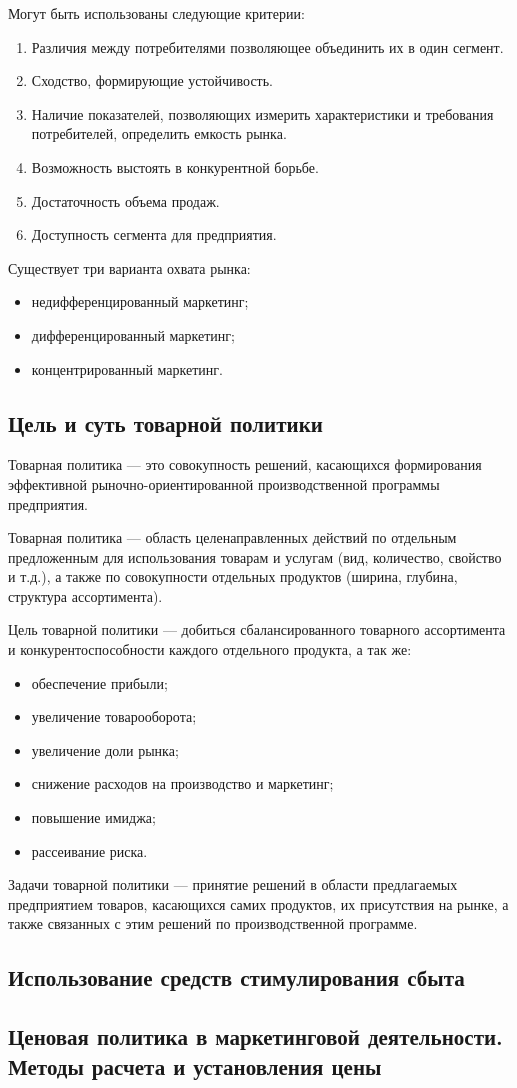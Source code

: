 \documentclass[a4paper,12pt,oneside,final]{extarticle}
\numberwithin{equation}{section}
\begin{document}
Могут быть использованы следующие критерии:
\begin{enumerate}
	\item Различия между потребителями позволяющее объединить их в один сегмент.
	\item Сходство, формирующие устойчивость.
	\item Наличие показателей, позволяющих измерить характеристики и требования потребителей, определить емкость рынка.
	\item Возможность выстоять в конкурентной борьбе.
	\item Достаточность объема продаж.
	\item Доступность сегмента для предприятия.
\end{enumerate}

Существует три варианта охвата рынка:
\begin{itemize}
	\item недифференцированный маркетинг;
	\item дифференцированный маркетинг;
	\item концентрированный маркетинг.
\end{itemize}

\subsection{Цель и суть товарной политики}
Товарная политика --- это совокупность решений, касающихся формирования эффективной рыночно-ориентированной производственной программы предприятия.

Товарная политика ­­--- область целенаправленных действий по отдельным предложенным для использования товарам и услугам (вид, количество, свойство и т.д.), а также по совокупности отдельных продуктов (ширина, глубина, структура ассортимента).

Цель товарной политики --- добиться сбалансированного товарного ассортимента и конкурентоспособности каждого отдельного продукта, а так же:
\begin{itemize}
		\item обеспечение прибыли;
		\item увеличение товарооборота;
		\item увеличение доли рынка;
		\item снижение расходов на производство и маркетинг;
		\item повышение имиджа;
		\item рассеивание риска.
\end{itemize}

Задачи товарной политики --- принятие решений в области предлагаемых предприятием товаров, касающихся самих продуктов, их присутствия на рынке, а также связанных с этим решений по производственной программе.

\subsection{Использование средств стимулирования сбыта}

\subsection{Ценовая политика в маркетинговой деятельности. Методы расчета и установления цены}
\end{document}
